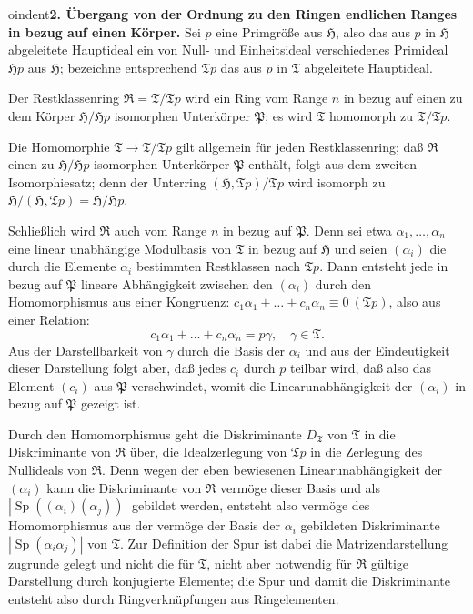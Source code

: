 \documentclass[12pt,a4paper]{article}
\newcommand{\mf}[1]{\mathfrak{#1}}     %
\newcommand{\HH}{\mathfrak{H}}          %
\newcommand{\PP}{\mathfrak{P}}          %
\DeclareMathOperator{\Sp}{Sp}           %
\newcommand{\TT}{\mathfrak{T}}          %
\theoremstyle{definition}
\begin{document}
\medskip



oindent\textbf{2. \"Ubergang von der Ordnung zu den Ringen endlichen Ranges
in bezug auf einen K\"orper.} Sei $p$ eine Primgr\"o\ss e aus $\HH$, also
das aus $p$ in $\HH$ abgeleitete Hauptideal ein von Null- und
Einheitsideal verschiedenes Primideal $\HH p$ aus $\HH$; bezeichne
entsprechend $\TT p$ das aus $p$ in $\TT$ abgeleitete Hauptideal.

Der Restklassenring $\mf{R} = \TT/\TT p$ wird ein Ring vom Range $n$ in
bezug auf einen zu dem K\"orper $\HH/\HH p$ isomorphen Unterk\"orper $\PP$;
es wird $\TT$ homomorph zu $\TT/\TT p$.

Die Homomorphie $\TT \to \TT/\TT p$ gilt allgemein f\"ur jeden
Restklassenring; da\ss{} $\mf{R}$ einen zu $\HH/\HH p$ isomorphen Unterk\"orper
$\PP$ enth\"alt, folgt aus dem zweiten Isomorphiesatz; denn der Unterring
$(\HH, \TT p)/\TT p$ wird isomorph zu $\HH/(\HH, \TT p) = \HH/\HH p$.

Schlie\ss lich wird $\mf{R}$ auch vom Range $n$ in bezug auf $\PP$. Denn
sei etwa $\alpha_1,\dots,\alpha_n$ eine linear unabh\"angige Modulbasis von
$\TT$ in bezug auf $\HH$ und seien $(\alpha_i)$ die durch die Elemente
$\alpha_i$ bestimmten Restklassen nach $\TT p$. Dann entsteht jede in
bezug auf $\PP$ lineare Abh\"angigkeit zwischen den $(\alpha_i)$ durch den
Homomorphismus aus einer Kongruenz:
$c_1\alpha_1 + \dots + c_n\alpha_n \equiv 0\ (\TT p)$, also aus einer
Relation:
\[
c_1\alpha_1 + \dots + c_n\alpha_n = p\gamma, \quad \gamma \in \TT.
\]
Aus der Darstellbarkeit von $\gamma$ durch die Basis der $\alpha_i$ und
aus der Eindeutigkeit dieser Darstellung folgt aber, da\ss{} jedes $c_i$
durch $p$ teilbar wird, da\ss{} also das Element $(c_i)$ aus $\PP$
verschwindet, womit die Linearunabh\"angigkeit der $(\alpha_i)$ in bezug
auf $\PP$ gezeigt ist.

Durch den Homomorphismus geht die Diskriminante $D_{\TT}$ von $\TT$ in die
Diskriminante von $\mf{R}$ \"uber, die Idealzerlegung von $\TT p$ in die
Zerlegung des Nullideals von $\mf{R}$. Denn wegen der eben bewiesenen
Linearunabh\"angigkeit der $(\alpha_i)$ kann die Diskriminante von $\mf{R}$
verm\"oge dieser Basis und als $|\Sp((\alpha_i)(\alpha_j))|$ gebildet
werden, entsteht also verm\"oge des Homomorphismus aus der verm\"oge der
Basis der $\alpha_i$ gebildeten Diskriminante $|\Sp(\alpha_i\alpha_j)|$ von
$\TT$. Zur Definition der Spur ist dabei die Matrizendarstellung
zugrunde gelegt und nicht die f\"ur $\TT$, nicht aber notwendig f\"ur
$\mf{R}$ g\"ultige Darstellung durch konjugierte Elemente; die Spur und
damit die Diskriminante entsteht also durch Ringverkn\"upfungen aus
Ringelementen.
\end{document}
